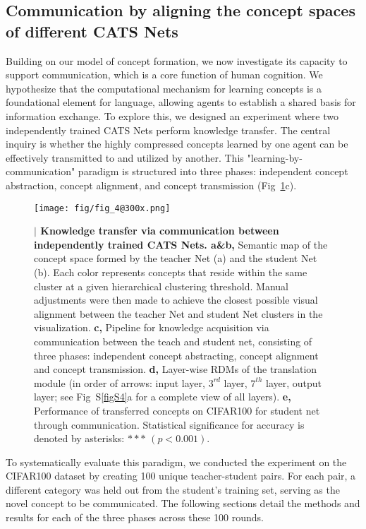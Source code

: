 \documentclass[pdflatex,sn-mathphys-num,lineno]{sn-jnl}%
\begin{document}
\begin{CJK}{UTF8}{gbsn}
\subsection{Communication by aligning the concept spaces of different CATS Nets}
Building on our model of concept formation, we now investigate its capacity to support communication, which is a core function of human cognition. We hypothesize that the computational mechanism for learning concepts is a foundational element for language, allowing agents to establish a shared basis for information exchange. To explore this, we designed an experiment where two independently trained CATS Nets perform knowledge transfer. The central inquiry is whether the highly compressed concepts learned by one agent can be effectively transmitted to and utilized by another. This "learning-by-communication" paradigm is structured into three phases: independent concept abstraction, concept alignment, and concept transmission (Fig~\ref{fig4}c).

\begin{figure}[htbp]
\centering
\texttt{[image: fig/fig\_4@300x.png]}
\caption{\textbf{$\vert$ Knowledge transfer via communication between independently trained CATS Nets. a\&b,} Semantic map of the concept space formed by the teacher Net (a) and the student Net (b). Each color represents concepts that reside within the same cluster at a given hierarchical clustering threshold. Manual adjustments were then made to achieve the closest possible visual alignment between the teacher Net and student Net clusters in the visualization. \textbf{c,} Pipeline for knowledge acquisition via communication between the teach and student net, consisting of three phases: independent concept abstracting, concept alignment and concept transmission. \textbf{d,} Layer-wise RDMs of the translation module (in order of arrows: input layer, $3^{rd}$ layer, $7^{th}$ layer, output layer; see Fig~S\ref{figS4}a for a complete view of all layers). \textbf{e,} Performance of transferred concepts on CIFAR100 for student net through communication. Statistical significance for accuracy is denoted by asterisks: $***$ $(p < 0.001)$.}
\label{fig4}
\end{figure}

To systematically evaluate this paradigm, we conducted the experiment on the CIFAR100 dataset by creating 100 unique teacher-student pairs. For each pair, a different category was held out from the student's training set, serving as the novel concept to be communicated. The following sections detail the methods and results for each of the three phases across these 100 rounds.


\end{CJK}
\end{document}
